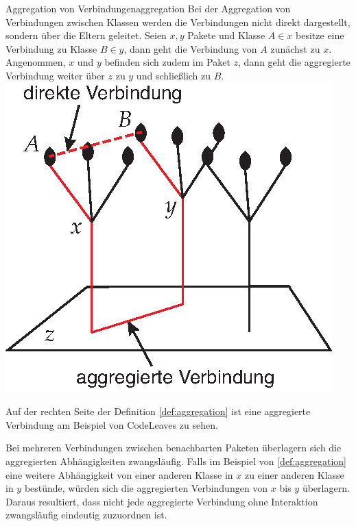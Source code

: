 \begin{splitbox}{Aggregation von Verbindungen}{aggregation}
Bei der Aggregation von Verbindungen zwischen Klassen werden die Verbindungen nicht direkt dargestellt, sondern über die Eltern geleitet. Seien $x, y$ Pakete und Klasse $A \in x$ besitze eine Verbindung zu Klasse $B \in y$, dann geht die Verbindung von $A$ zunächst zu $x$. Angenommen, $x$ und $y$ befinden sich zudem im Paket $z$, dann geht die aggregierte Verbindung weiter über $z$ zu $y$ und schließlich zu $B$.
\tcblower
\includegraphics[width=\linewidth]{figures/aggregation}
\end{splitbox}

Auf der rechten Seite der Definition \ref{def:aggregation} ist eine aggregierte Verbindung am Beispiel von CodeLeaves zu sehen.

Bei mehreren Verbindungen zwischen benachbarten Paketen überlagern sich die aggregierten Abhängigkeiten zwangsläufig. Falls im Beispiel von \ref{def:aggregation} eine weitere Abhängigkeit von einer anderen Klasse in $x$ zu einer anderen Klasse in $y$ bestünde, würden sich die aggregierten Verbindungen von $x$ bis $y$ überlagern. Daraus resultiert, dass nicht jede aggregierte Verbindung ohne Interaktion zwangsläufig eindeutig zuzuordnen ist.


